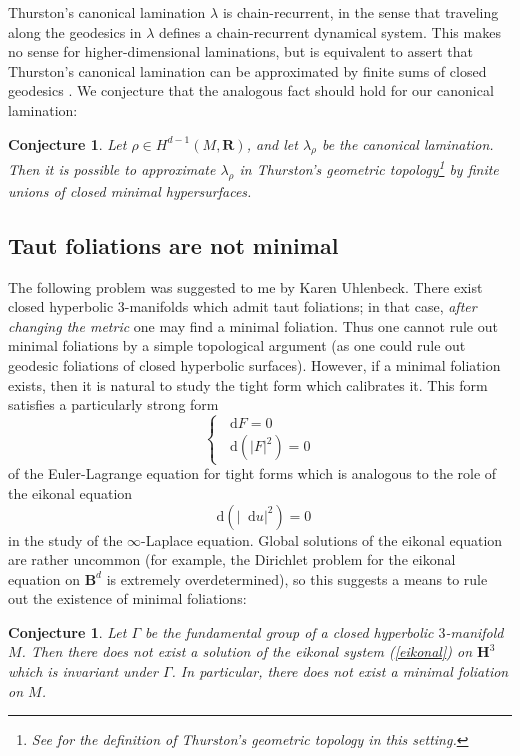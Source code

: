 \documentclass[reqno,11pt]{amsart}
\newcommand{\RR}{\mathbf{R}}
\newcommand{\Hyp}{\mathbf H}
\newcommand{\Ball}{\mathbf{B}}
\newcommand*\dif{\mathop{}\!\mathrm{d}}
\newtheorem{conjecture}[theorem]{Conjecture}
\theoremstyle{definition}
\numberwithin{equation}{section}
\begin{document}
Thurston's canonical lamination $\lambda$ is chain-recurrent, in the sense that traveling along the geodesics in $\lambda$ defines a chain-recurrent dynamical system.
This makes no sense for higher-dimensional laminations, but is equivalent to assert that Thurston's canonical lamination can be approximated by finite sums of closed geodesics \cite[\S9]{Gu_ritaud_2017}.
We conjecture that the analogous fact should hold for our canonical lamination:

\begin{conjecture}\label{chain recurrence}
Let $\rho \in H^{d - 1}(M, \RR)$, and let $\lambda_\rho$ be the canonical lamination.
Then it is possible to approximate $\lambda_\rho$ in Thurston's geometric topology\footnote{See \cite[\S1]{BackusCML} for the definition of Thurston's geometric topology in this setting.} by finite unions of closed minimal hypersurfaces.
\end{conjecture}

\subsection{Taut foliations are not minimal}
The following problem was suggested to me by Karen Uhlenbeck. 
There exist closed hyperbolic $3$-manifolds which admit taut foliations; in that case, \emph{after changing the metric} one may find a minimal foliation.
Thus one cannot rule out minimal foliations by a simple topological argument (as one could rule out geodesic foliations of closed hyperbolic surfaces).
However, if a minimal foliation exists, then it is natural to study the tight form which calibrates it.
This form satisfies a particularly strong form 
\begin{equation}\label{eikonal}
\begin{cases}\dif F = 0 \\ \dif(|F|^2) = 0\end{cases}
\end{equation}
of the Euler-Lagrange equation for tight forms which is analogous to the role of the eikonal equation
$$\dif(|\dif u|^2) = 0$$
in the study of the $\infty$-Laplace equation.
Global solutions of the eikonal equation are rather uncommon (for example, the Dirichlet problem for the eikonal equation on $\Ball^d$ is extremely overdetermined), so this suggests a means to rule out the existence of minimal foliations:

\begin{conjecture}\label{Karen}
Let $\Gamma$ be the fundamental group of a closed hyperbolic $3$-manifold $M$.
Then there does not exist a solution of the eikonal system (\ref{eikonal}) on $\Hyp^3$ which is invariant under $\Gamma$.
In particular, there does not exist a minimal foliation on $M$.
\end{conjecture}
\end{document}
